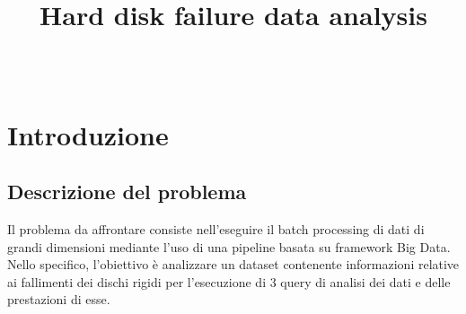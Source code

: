 \documentclass[conference]{IEEEtran}
\begin{document}
\title{Hard disk failure data analysis\\}

\author{
\and
{}
\\
}


\maketitle

\begin{abstract}
\end{abstract}

\section{Introduzione}
\subsection{Descrizione del problema}
Il problema da affrontare consiste nell'eseguire il batch processing di dati di grandi dimensioni mediante l'uso di una pipeline basata su framework Big Data. Nello specifico, l'obiettivo è analizzare un dataset contenente informazioni relative ai fallimenti dei dischi rigidi per l'esecuzione di 3 query di analisi dei dati e delle prestazioni di esse.
\end{document}
